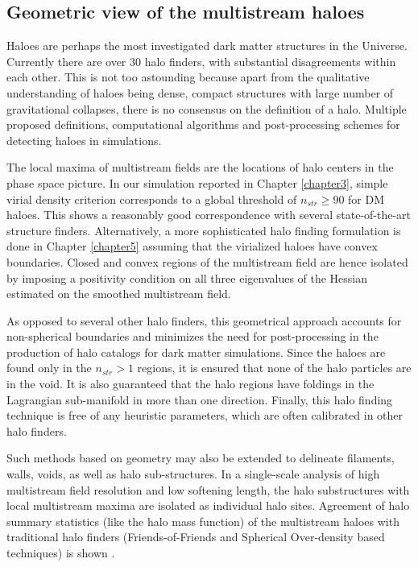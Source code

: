 \subsection{Geometric view of the multistream haloes}


Haloes are perhaps the most investigated dark matter structures in the Universe. Currently there are over 30 halo finders, with substantial disagreements within each other. This is not too astounding because apart from the qualitative understanding of haloes being dense, compact structures with large number of gravitational collapses, there is no consensus on the definition of a halo. Multiple proposed definitions, computational algorithms and post-processing schemes for detecting haloes in simulations. 

The local maxima of multistream fields are the locations of halo centers in the phase space picture. In our simulation reported in Chapter \ref{chapter3}, simple virial density criterion corresponds to a global threshold of $n_{str} \geq 90$ for DM haloes. This shows a reasonably good correspondence with several state-of-the-art structure finders. Alternatively, a more sophisticated halo finding formulation is done in Chapter \ref{chapter5} assuming that the virialized haloes have convex boundaries. Closed and convex regions of the multistream field are hence isolated by imposing a positivity condition on all three eigenvalues of the Hessian estimated on the smoothed multistream field. 

As opposed to several other halo finders, this geometrical approach accounts for non-spherical boundaries and minimizes the need for post-processing in the production of halo catalogs for dark matter simulations. Since the haloes are found only in the $n_{str} > 1$ regions, it is ensured that none of the halo particles are in the void. It is also guaranteed that the halo regions have foldings in the Lagrangian sub-manifold in more than one direction. Finally, this halo finding technique is free of any heuristic parameters, which are often calibrated in other halo finders.  

Such methods based on geometry may also be extended to delineate filaments, walls, voids, as well as halo sub-structures. In a single-scale analysis of high multistream field resolution and low softening length, the halo substructures with local multistream maxima are isolated as individual halo sites. Agreement of halo summary statistics (like the halo mass function) of the multistream haloes with traditional halo finders (Friends-of-Friends and Spherical Over-density based techniques) is shown \cite{Ramachandra2017b}. 

